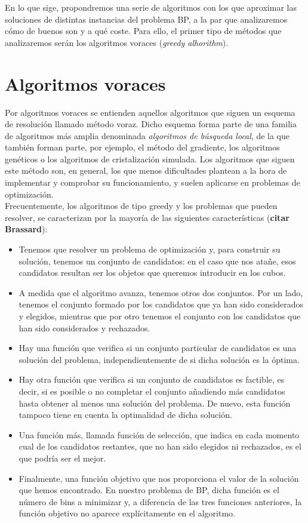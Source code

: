 \documentclass[a4paper, 12pt, oneside]{book}
\begin{document}
	En lo que sige, propondremos una serie de algoritmos con los que aproximar las soluciones de distintas instancias del problema BP, a la par que analizaremos c\'omo de buenos son y a qu\'e coste. Para ello, el primer tipo de m\'etodos que analizaremos ser\'an los algoritmos voraces (\textit{greedy alhorithm}).
	
	\section{Algoritmos voraces}
	Por algoritmos voraces se entienden aquellos algoritmos que siguen un esquema de resoluci\'on llamado m\'etodo voraz. Dicho esquema forma parte de una familia de algoritmos m\'as amplia denominada \textit{algoritmos de b\'usqueda local}, de la que tambi\'en forman parte, por ejemplo, el m\'etodo del gradiente, los algoritmos gen\'eticos o los algoritmos de cristalizaci\'on simulada. Los algoritmos que siguen este m\'etodo son, en general, los que menos dificultades plantean a la hora de implementar y comprobar su funcionamiento, y suelen aplicarse en problemas de optimizaci\'on.
	\\
	
	Frecuentemente, los algoritmos de tipo greedy y los problemas que pueden resolver, se caracterizan por la mayor\'ia de las siguientes caracter\'isticas (\textbf{citar Brassard}):
	
	\begin{itemize}
		\item Tenemos que resolver un problema de optimizaci\'on y, para construir su soluci\'on, tenemos un conjunto de candidatos: en el caso que nos ata\~{n}e, esos candidatos resultan ser los objetos que queremos introducir en los cubos.
		\item A medida que el algoritmo avanza, tenemos otros dos conjuntos. Por un lado, tenemos el conjunto formado por los candidatos que ya han sido considerados y elegidos, mientras que por otro tenemos el conjunto con los candidatos que han sido considerados y rechazados.
		\item Hay una funci\'on que verifica si un conjunto particular de candidatos es una soluci\'on del problema, independientemente de si dicha soluci\'on es la \'optima.
		\item Hay otra funci\'on que verifica si un conjunto de candidatos es factible, es decir, si es posible o no completar el conjunto a\~{n}adiendo m\'as candidatos hasta obtener al menos una soluci\'on del problema. De nuevo, esta funci\'on tampoco tiene en cuenta la optimalidad de dicha soluci\'on.
		\item Una funci\'on m\'as, llamada funci\'on de selecci\'on, que indica en cada momento cual de los candidatos restantes, que no han sido elegidos ni rechazados, es el que podr\'ia ser el mejor.
		\item Finalmente, una funci\'on objetivo que nos proporciona el valor de la soluci\'on que hemos encontrado. En nuestro problema de BP, dicha funci\'on
		es el n\'umero de bins a minimizar y, a diferencia de las tres funciones
		anteriores, la funci\'on objetivo no aparece expl\'icitamente en el algoritmo.
	\end{itemize}
	
\end{document}
